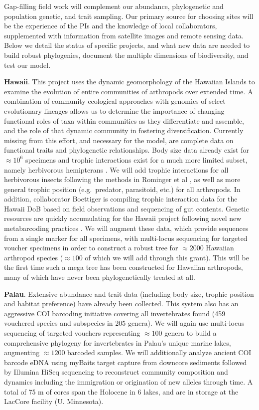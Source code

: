 \documentclass[11pt]{article}
\begin{document}
Gap-filling field work will complement our abundance, phylogenetic and
population genetic, and trait sampling. Our primary source for
choosing sites will be the experience of the PIs and the knowledge of
local collaborators, supplemented with information from satellite
images and remote sensing data. Below we detail the status of specific
projects, and what new data are needed to build robust phylogenies,
document the multiple dimensions of biodiversity, and test our model.

\textbf{Hawaii}. This project uses the dynamic geomorphology of the
Hawaiian Islands to examine the evolution of entire communities of
arthropods over extended time. A combination of community ecological
approaches with genomics of select evolutionary lineages allows us to
determine the importance of changing functional roles of taxa within
communities as they differentiate and assemble, and the role of that
dynamic community in fostering diversification. Currently missing from
this effort, and necessary for the model, are complete data on
functional traits and phylogenetic relationships. Body size data
already exist for $\approx 10^6$ specimens and trophic interactions
exist for a much more limited subset, namely herbivorous hemipterans
\cite{Rominger2015-kb}. We will add trophic interactions for all
herbivorous insects following the methods in Rominger et al
\cite{Rominger2015-kb}, as well as more general trophic position
(e.g.~predator, parasitoid, etc.) for all arthropods. In addition,
collaborator Boettiger is compiling trophic interaction data for the
Hawaii DoB based on field observations and sequencing of gut contents.
Genetic resources are quickly accumulating for the Hawaii project
following novel new metabarcoding practices
\cite{Krehenwinkel2017-zk}. We will augment these data, which provide
sequences from a single marker for all specimens, with multi-locus
sequencing for targeted voucher specimens in order to construct a
robust tree for $\approx 2000$ Hawaiian arthropod species
($\approx 100$ of which we will add through this grant). This will be
the first time such a mega tree has been constructed for Hawaiian
arthropods, many of which have never been phylogenetically treated at
all.

\textbf{Palau}. Extensive abundance and trait data (including body
size, trophic position and habitat preference) have already been
collected. This system also has an aggressive COI barcoding initiative
covering all invertebrates found (459 vouchered species and subspecies
in 205 genera). We will again use multi-locus sequencing of targeted
vouchers representing $\approx 100$ genera to build a comprehensive
phylogeny for invertebrates in Palau's unique marine lakes, augmenting
$\approx 1200$ barcoded samples. We will additionally analyze ancient
COI barcode eDNA using myBaits target capture from downcore sediments
followed by Illumina HiSeq sequencing to reconstruct community
composition and dynamics including the immigration or origination of
new alleles through time. A total of 75 m of cores span the Holocene
in 6 lakes, and are in storage at the LacCore facility (U. Minnesota).
\end{document}
